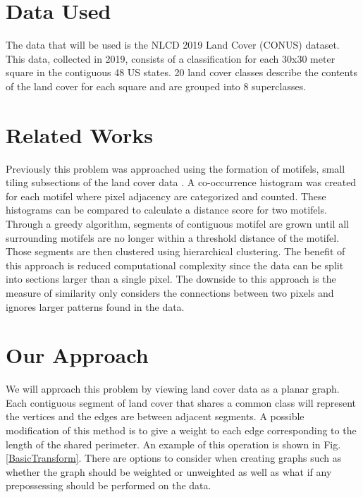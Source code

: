 \documentclass[conference]{IEEEtran}
\begin{document}
	\section{Data Used}
	The data that will be used is the NLCD 2019 Land Cover (CONUS) dataset. This data, collected in
	2019, consists of a classification for each 30x30 meter square in the contiguous 48 US states.
	20 land cover classes describe the contents of the land cover for each square and are grouped into 8 superclasses. \cite{NLCD2019LandCover}
	
	\section{Related Works}
	Previously this problem was approached using the formation of motifels, small tiling subsections of the land cover data \cite{doi:10.1080/13658816.2015.1134796}. A co-occurrence histogram was created for each motifel where pixel adjacency are categorized and counted. These histograms can be compared to calculate a distance score for two motifels. Through a greedy algorithm, segments of contiguous motifel are grown until all surrounding motifels are no longer within a threshold distance of the motifel. Those segments are then clustered using hierarchical clustering. The benefit of this approach is reduced computational complexity since the data can be split into sections larger than a single pixel. The downside to this approach is the measure of similarity only considers the connections between two pixels and ignores larger patterns found in the data.
	
	
	\section{Our Approach}
	We will approach this problem by viewing land cover data as a planar graph. Each contiguous segment of land cover that shares a common class will represent the vertices and the edges are between adjacent segments. A possible modification of this method is to give a weight to each edge corresponding to the length of the shared perimeter. An example of this operation is shown in Fig. \ref{BasicTransform}. There are options to consider when creating graphs such as whether the graph should be weighted or unweighted as well as what if any prepossessing should be performed on the data.
	
\end{document}
